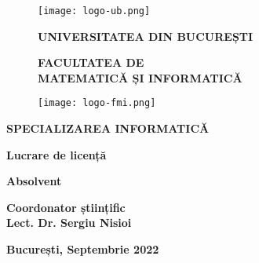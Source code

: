 \begin{titlepage}

\begin{figure}[!htb]
    \centering
    \begin{minipage}{0.2\textwidth}
        \texttt{[image: logo-ub.png]}
    \end{minipage}
    \begin{minipage}{0.5\textwidth}
        \large
        \vspace{0.2cm}
        \begin{center}
            \textbf{UNIVERSITATEA DIN BUCUREȘTI}
        \end{center}
        \vspace{0.3cm}
        \begin{center}
            \textbf{
                FACULTATEA DE \\
                MATEMATICĂ ȘI INFORMATICĂ
            }
        \end{center}
    \end{minipage}
    \begin{minipage}{0.2\textwidth}
        \texttt{[image: logo-fmi.png]}
    \end{minipage}
\end{figure}

\begin{center}
\textbf{SPECIALIZAREA INFORMATICĂ}
\end{center}

\vspace{0.5cm}

\begin{center}
\Large \textbf{Lucrare de licență}
\end{center}

\begin{center}
\huge \textbf{\@title}
\end{center}

\vspace{0.7cm}

\begin{center}
\large \textbf{Absolvent \\ \@author}
\end{center}

\vspace{0.1cm}

\begin{center}
\large \textbf{Coordonator științific \\ Lect. Dr. Sergiu Nisioi}
\end{center}

\vspace{0.3cm}

\begin{center}
\Large \textbf{București, Septembrie 2022}
\end{center}
\end{titlepage}


